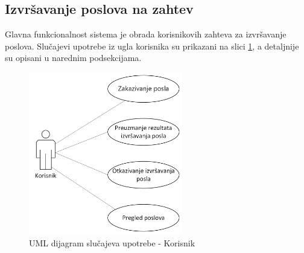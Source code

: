 \documentclass[12pt,oneside]{memoir}
\begin{document}
\subsection{Izvršavanje poslova na zahtev}
Glavna funkcionalnost sistema je obrada korisnikovih zahteva za izvršavanje poslova. 
Slučajevi upotrebe iz ugla korisnika su prikazani na slici \ref{fig:slucajupotrebe_korisnik}, a detaljnije su opisani u narednim podsekcijama.

\begin{figure}[!ht]
  \centering
  \includegraphics[width=0.6\textwidth]{./images/dijagram_slucajeva_upotrebe_korisnik.png}
  \caption{UML dijagram slučajeva upotrebe - Korisnik}
  \label{fig:slucajupotrebe_korisnik}
\end{figure}

\end{document}
